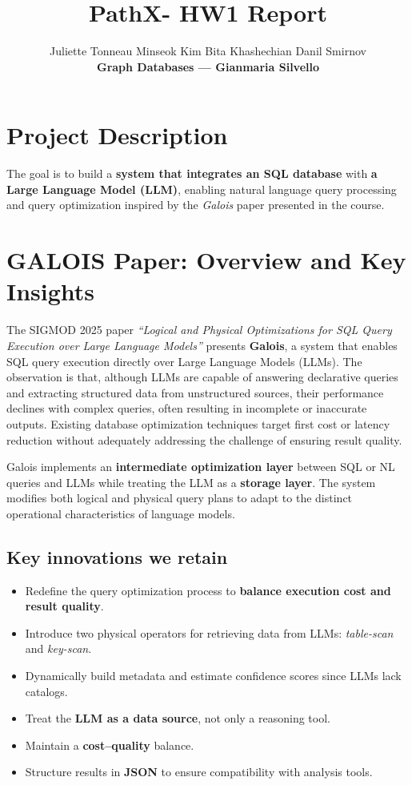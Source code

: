 \documentclass[11pt,a4paper]{article}
\title{PathX- HW1 Report}
\author{Juliette Tonneau \quad Minseok Kim \quad Bita Khashechian \quad Danil Smirnov\\[4pt]
\textbf{Graph Databases — Gianmaria Silvello}}
\begin{document}
\maketitle

\section{Project Description}

The goal is to build a \textbf{system that integrates an SQL database} with \textbf{a Large Language Model (LLM)}, enabling natural language query processing and query optimization inspired by the \emph{Galois} paper presented in the course.


\section{GALOIS Paper: Overview and Key Insights}

The SIGMOD 2025 paper \emph{``Logical and Physical Optimizations for SQL Query Execution over Large Language Models''} presents \textbf{Galois}, a system that enables SQL query execution directly over Large Language Models (LLMs). The observation is that, although LLMs are capable of answering declarative queries and extracting structured data from unstructured sources, their performance declines with complex queries, often resulting in incomplete or inaccurate outputs. Existing database optimization techniques target first cost or latency reduction without adequately addressing the challenge of ensuring result quality.

Galois implements an \textbf{intermediate optimization layer} between SQL or NL queries and LLMs while treating the LLM as a \textbf{storage layer}. The system modifies both logical and physical query plans to adapt to the distinct operational characteristics of language models.

\subsection*{Key innovations we retain}

\begin{itemize}[nosep]
  \item Redefine the query optimization process to \textbf{balance execution cost and result quality}.
  \item Introduce two physical operators for retrieving data from LLMs: \emph{table-scan} and \emph{key-scan}.
  \item Dynamically build metadata and estimate confidence scores since LLMs lack catalogs.
  \item Treat the \textbf{LLM as a data source}, not only a reasoning tool.
  \item Maintain a \textbf{cost--quality} balance.
  \item Structure results in \textbf{JSON} to ensure compatibility with analysis tools.
\end{itemize}
\end{document}
